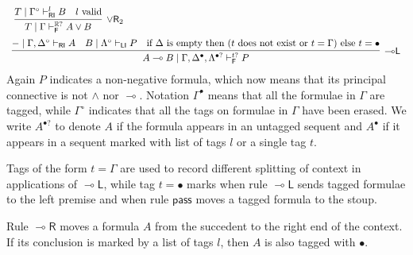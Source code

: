\documentclass[submission,copyright,creativecommons]{eptcs}
\theoremstyle{definition}
\newcommand{\lright}{{\multimap}\mathsf{R}}
\newcommand{\lleft}{{\multimap}\mathsf{L}}
\newcommand{\pass}{\mathsf{pass}}
\newcommand{\orrtwo}{\lor \mathsf{R}_{2}}
\newcommand{\lolli}{\multimap}
\newcommand{\RI}{\mathsf{RI}}
\newcommand{\LI}{\mathsf{LI}}
\newcommand{\F}{\mathsf{F}}
\newcommand{\tP}{\mathbb{P}}
\newcommand{\tE}{\mathbb{R}}
\begin{document}
\begin{equation}
\begin{array}{lc}
{{    }
    \;
    \infer[\orrtwo]{T \mid \Gamma \vdash^{\tE?}_{\F} A \lor B}{
      T \mid \Gamma^{\circ} \vdash^{l}_{\RI} B
      &
      l \ \text{valid}
    }
    }
    \\[6pt]
    \multicolumn{2}{c}{
      \infer[\lleft]{A \lolli B \mid \Gamma , \Delta^{\bullet} , \Lambda^{\bullet?} \vdash^{t?}_{\F} P}{
        - \mid \Gamma , \Delta^{\circ} \vdash_{\RI} A
        &
        B \mid \Lambda^{\circ} \vdash_{\LI} P
        &
        \text{if } \Delta \text{ is empty then } (t \text{ does not exist or } t =  \Gamma)  \text{ else }  t = \bullet 
      }
    }
  \end{array}
\end{equation}
Again $P$ indicates a non-negative formula, which now means that its principal connective is not $\land$ nor $\lolli$. Notation $\Gamma^{\bullet}$ means that all the formulae in $\Gamma$ are tagged, while $\Gamma^{\circ}$ indicates that all the tags on formulae in $\Gamma$ have been erased. We write $A^{\bullet?}$ to denote $A$ if the formula appears in an untagged sequent and $A^\bullet$ if it appears in a sequent marked with list of tags $l$ or a single tag $t$.

Tags of the form $t = \Gamma$ are used to record different splitting of context in applications of $\lleft$, while tag $t = \bullet$ marks when rule $\lleft$ sends tagged formulae to the left premise and when rule $\pass$ moves a tagged formula to the stoup.

Rule $\lright$  moves a formula $A$ from the succedent to the right end of the context. If its conclusion is marked by a list of tags $l$, then $A$ is also tagged with $\bullet$.
\end{document}
